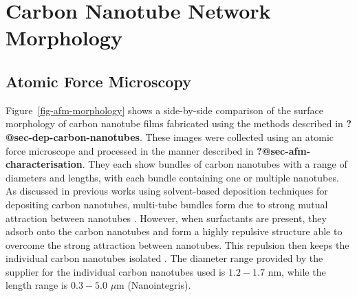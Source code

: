 \documentclass[
  a4paper,
]{scrbook}
\begin{document}
\hypertarget{sec-pristine-morphology}{%
\section{Carbon Nanotube Network
Morphology}\label{sec-pristine-morphology}}

\hypertarget{atomic-force-microscopy}{%
\subsection{Atomic Force Microscopy}\label{atomic-force-microscopy}}

Figure~\ref{fig-afm-morphology} shows a side-by-side comparison of the
surface morphology of carbon nanotube films fabricated using the methods
described in \textbf{?@sec-dep-carbon-nanotubes}. These images were
collected using an atomic force microscope and processed in the manner
described in \textbf{?@sec-afm-characterisation}. They each show bundles
of carbon nanotubes with a range of diameters and lengths, with each
bundle containing one or multiple nanotubes. As discussed in previous
works using solvent-based deposition techniques for depositing carbon
nanotubes, multi-tube bundles form due to strong mutual attraction
between nanotubes
\autocite{Zheng2017,Murugathas2018,Murugathas2019a,Nguyen2021}. However,
when surfactants are present, they adsorb onto the carbon nanotubes and
form a highly repulsive structure able to overcome the strong attraction
between nanotubes. This repulsion then keeps the individual carbon
nanotubes isolated
\autocite{Wenseleers2004,Gavrel2013,Hermanson2013-16,Shimizu2013,DiCrescenzo2014}.
The diameter range provided by the supplier for the individual carbon
nanotubes used is \(1.2-1.7\) nm, while the length range is \(0.3-5.0\)
\(\mu\)m (Nanointegris).
\end{document}
